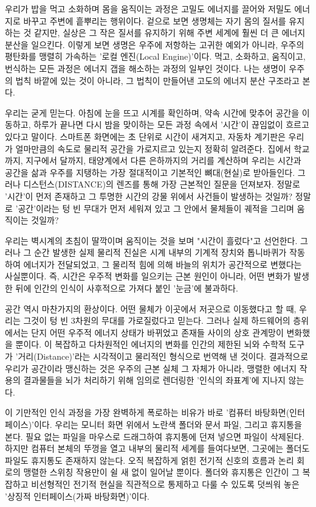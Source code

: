 우리가 밥을 먹고 소화하며 몸을 움직이는 과정은 고밀도 에너지를 끌어와 저밀도 에너지로 바꾸고 주변에 흩뿌리는 행위이다. 겉으로 보면 생명체는 자기 몸의 질서를 유지하는 것 같지만, 실상은 그 작은 질서를 유지하기 위해 주변 세계에 훨씬 더 큰 에너지 분산을 일으킨다. 이렇게 보면 생명은 우주에 저항하는 고귀한 예외가 아니라, 우주의 평탄화를 맹렬히 가속하는 '로컬 엔진(Local Engine)'이다. 먹고, 소화하고, 움직이고, 번식하는 모든 과정은 에너지 갭을 해소하는 과정의 일부인 것이다. 나는 생명이 우주의 법칙 바깥에 있는 것이 아니라, 그 법칙이 만들어낸 고도의 에너지 분산 구조라고 본다.

우리는 굳게 믿는다. 아침에 눈을 뜨고 시계를 확인하며, 약속 시간에 맞추어 공간을 이동하고, 하루가 끝나면 다시 밤을 맞이하는 모든 과정 속에서 '시간'이 끊임없이 흐르고 있다고 말이다.
스마트폰 화면에는 초 단위로 시간이 새겨지고, 자동차 계기판은 우리가 얼마만큼의 속도로 물리적 공간을 가로지르고 있는지 정확히 알려준다. 집에서 학교까지, 지구에서 달까지, 태양계에서 다른 은하까지의 거리를 계산하며 우리는 시간과 공간을 삶과 우주를 지탱하는 가장 절대적이고 기본적인 뼈대(현실)로 받아들인다.
그러나 디스턴스(DISTANCE)의 렌즈를 통해 가장 근본적인 질문을 던져보자. 정말로 '시간'이 먼저 존재하고 그 투명한 시간의 강물 위에서 사건들이 발생하는 것일까? 정말로 '공간'이라는 텅 빈 무대가 먼저 세워져 있고 그 안에서 물체들이 궤적을 그리며 움직이는 것일까?

우리는 벽시계의 초침이 딸깍이며 움직이는 것을 보며 "시간이 흘렀다"고 선언한다. 그러나 그 순간 발생한 실제 물리적 진실은 시계 내부의 기계적 장치와 톱니바퀴가 작동하여 에너지가 전달되었고, 그 물리적 힘에 의해 바늘의 위치가 공간적으로 변했다는 사실뿐이다. 즉, 시간은 우주적 변화를 일으키는 근본 원인이 아니라, 어떤 변화가 발생한 뒤에 인간의 인식이 사후적으로 가져다 붙인 '눈금'에 불과하다.

공간 역시 마찬가지의 환상이다. 어떤 물체가 이곳에서 저곳으로 이동했다고 할 때, 우리는 그것이 텅 빈 3차원의 무대를 가로질렀다고 믿는다. 그러나 실제 하드웨어의 층위에서는 단지 어떤 우주적 에너지 상태가 바뀌었고 존재들 사이의 상호 관계망이 변화했을 뿐이다. 이 복잡하고 다차원적인 에너지의 변화를 인간의 제한된 뇌와 수학적 도구가 '거리(Distance)'라는 시각적이고 물리적인 형식으로 번역해 낸 것이다. 결과적으로 우리가 공간이라 맹신하는 것은 우주의 근본 실체 그 자체가 아니라, 맹렬한 에너지 작용의 결과물들을 뇌가 처리하기 위해 임의로 렌더링한 '인식의 좌표계'에 지나지 않는다.

이 기만적인 인식 과정을 가장 완벽하게 폭로하는 비유가 바로 '컴퓨터 바탕화면(인터페이스)'이다. 우리는 모니터 화면 위에서 노란색 폴더와 문서 파일, 그리고 휴지통을 본다. 필요 없는 파일을 마우스로 드래그하여 휴지통에 던져 넣으면 파일이 삭제된다. 하지만 컴퓨터 본체의 뚜껑을 열고 내부의 물리적 세계를 들여다보면, 그곳에는 폴더도 파일도 휴지통도 존재하지 않는다. 오직 복잡하게 얽힌 전기적 신호의 흐름과 논리 회로의 맹렬한 스위칭 작용만이 쉴 새 없이 일어날 뿐이다. 폴더와 휴지통은 인간이 그 복잡하고 비선형적인 전기적 현실을 직관적으로 통제하고 다룰 수 있도록 덧씌워 놓은 '상징적 인터페이스(가짜 바탕화면)'이다.


